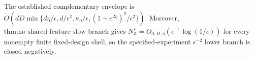 The established complementary envelope is \(\widetilde O(dD\min\{d\eta/\epsilon,d/\epsilon^2,\kappa_\eta/\epsilon,(1+e^{2\eta})^2/\epsilon^2\})\). Moreover, \(\text{thm:no-shared-feature-slow-branch}\) gives \(N^\star_{\mathfrak E}=O_{d,D,\eta}(\epsilon^{-1}\log(1/\epsilon))\) for every nonempty finite fixed-design shell, so the specified-experiment \(\epsilon^{-2}\) lower branch is closed negatively.